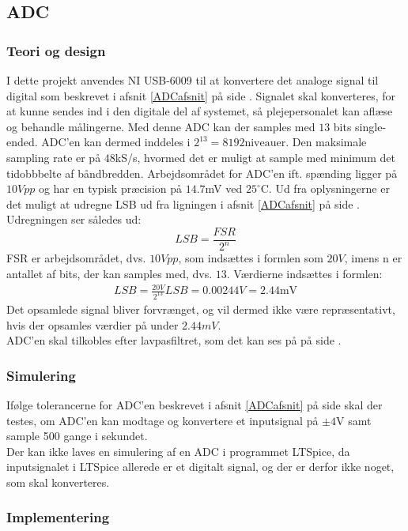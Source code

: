 \subsection{ADC}
\subsubsection{Teori og design}
I dette projekt anvendes NI USB-6009 til at konvertere det analoge signal til digital som beskrevet i afsnit \ref{ADCafsnit} på side \pageref{ADCafsnit}. Signalet skal konverteres, for at kunne sendes ind i den digitale del af systemet, så plejepersonalet kan aflæse og behandle målingerne. Med denne ADC kan der samples med $13$ bits single-ended. ADC'en kan dermed inddeles i $2^{13} = 8192 \text{niveauer}$. Den maksimale sampling rate er på $48$kS/s, hvormed det er muligt at sample med minimum det tidobbbelte af båndbredden. Arbejdsområdet for ADC'en ift. spænding ligger på $10Vpp$ og har en typisk præcision på $14.7$mV ved $25^{\circ}$C. \cite{Instruments2014} Ud fra oplysningerne er det muligt at udregne LSB ud fra ligningen i afsnit \ref{ADCafsnit} på side \pageref{ADCafsnit}. Udregningen ser således ud: \\
\begin{equation}
	LSB = \frac{FSR}{2^{n}} 
\end{equation}  
FSR er arbejdsområdet, dvs. $10Vpp$, som indsættes i formlen som $20V$, imens n er antallet af bits, der kan samples med, dvs. $13$.
Værdierne indsættes i formlen: \\
\begin{align}
	LSB = \frac{20V}{2^{13}}
	LSB = 0.00244V = 2.44\text{mV}
\end{align}
Det opsamlede signal bliver forvrænget, og vil dermed ikke være repræsentativt, hvis der opsamles værdier på under $2.44mV$.\\
ADC'en skal tilkobles efter lavpasfiltret, som det kan ses på  på side \pageref{kravblok}.
\subsubsection{Simulering}
Ifølge tolerancerne for ADC'en beskrevet i afsnit \ref{ADCafsnit} på side \pageref{ADCafsnit} skal der testes, om ADC'en kan modtage og konvertere et inputsignal på $\pm4$V samt sample 500 gange i sekundet. \\
Der kan ikke laves en simulering af en ADC i programmet LTSpice, da inputsignalet i LTSpice allerede er et digitalt signal, og der er derfor ikke noget, som skal konverteres.
 
\subsubsection{Implementering}
